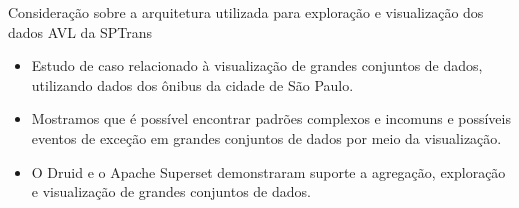 \documentclass{beamer}
\begin{document}
\begin{frame}{Consideração sobre a arquitetura utilizada para exploração e visualização dos dados AVL da SPTrans}
\begin{itemize}
    \item Estudo de caso relacionado à visualização de grandes conjuntos de dados, utilizando dados dos ônibus da cidade de São Paulo. 
    \item Mostramos que é possível encontrar padrões complexos e incomuns e possíveis eventos de exceção em grandes conjuntos de dados por meio da visualização. 
    \item O Druid e o Apache Superset demonstraram suporte a agregação, exploração e visualização de grandes conjuntos de dados.
\end{itemize}
\end{frame}
\end{document}
